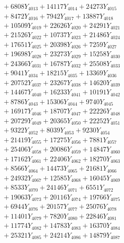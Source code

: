 \documentclass[a4paper,10pt]{article}
\begin{document}
{\begin{align}
&\;  + 6808 Y_{4013} + 14117 Y_{4014} + 24273 Y_{4015} \\[0.3ex]
&\;  + 8472 Y_{4016} + 7942 Y_{4017} + 13887 Y_{4018} \\[0.5ex]\allowbreak
&\;  + 10509 Y_{4019} + 22626 Y_{4020} + 24291 Y_{4021} \\[0.3ex]
&\;  + 21526 Y_{4022} + 10737 Y_{4023} + 21486 Y_{4024} \\[0.3ex]
&\;  + 17651 Y_{4025} + 20398 Y_{4026} + 7259 Y_{4027} \\[0.3ex]
&\;  + 19698 Y_{4028} + 23273 Y_{4029} + 15258 Y_{4030} \\[0.3ex]
&\;  + 24366 Y_{4031} + 16787 Y_{4032} + 25508 Y_{4033} \\[0.3ex]
&\;  + 9041 Y_{4034} + 18215 Y_{4035} + 13369 Y_{4036} \\[0.3ex]
&\;  + 20752 Y_{4037} + 23267 Y_{4038} + 14620 Y_{4039} \\[0.3ex]
&\;  + 14467 Y_{4040} + 16233 Y_{4041} + 10191 Y_{4042} \\[0.3ex]
&\;  + 8786 Y_{4043} + 15306 Y_{4044} + 9740 Y_{4045} \\[0.3ex]
&\;  + 16917 Y_{4046} + 18707 Y_{4047} + 22226 Y_{4048} \\[0.5ex]\allowbreak
&\;  + 20729 Y_{4049} + 20365 Y_{4050} + 22252 Y_{4051} \\[0.3ex]
&\;  + 9322 Y_{4052} + 8039 Y_{4053} + 9230 Y_{4054} \\[0.3ex]
&\;  + 21419 Y_{4055} + 17275 Y_{4056} + 7881 Y_{4057} \\[0.3ex]
&\;  + 25406 Y_{4058} + 20086 Y_{4059} + 14847 Y_{4060} \\[0.3ex]
&\;  + 17162 Y_{4061} + 22406 Y_{4062} + 18270 Y_{4063} \\[0.3ex]
&\;  + 8566 Y_{4064} + 14473 Y_{4065} + 21681 Y_{4066} \\[0.3ex]
&\;  + 24932 Y_{4067} + 12585 Y_{4068} + 16045 Y_{4069} \\[0.3ex]
&\;  + 8533 Y_{4070} + 24146 Y_{4071} + 6551 Y_{4072} \\[0.3ex]
&\;  + 19063 Y_{4073} + 20116 Y_{4074} + 19766 Y_{4075} \\[0.3ex]
&\;  + 6944 Y_{4076} + 20157 Y_{4077} + 25076 Y_{4078} \\[0.5ex]\allowbreak
&\;  + 11401 Y_{4079} + 7820 Y_{4080} + 22846 Y_{4081} \\[0.3ex]
&\;  + 11774 Y_{4082} + 14783 Y_{4083} + 16370 Y_{4084} \\[0.3ex]
&\;  + 25321 Y_{4085} + 24214 Y_{4086} + 14879 Y_{4087} \\[0.3ex]

\end{align}}
\end{document}
